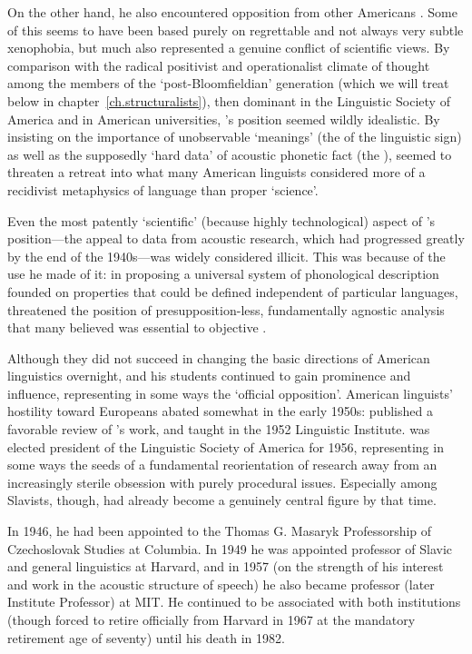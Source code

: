 On the other hand, he also encountered opposition from other Americans
\citep{dixon07:jakobson.2dollar.bills}. Some of this seems to have
been based purely on regrettable and not always very subtle
xenophobia, but much also represented a genuine conflict of scientific
views. By comparison with the radical positivist and operationalist
climate of thought among the members of the `post-Bloomfieldian'
generation (which we will treat below in
chapter~\ref{ch.structuralists}), then dominant in the Linguistic
Society of America and in American universities, {\Jakobson}'s position
seemed wildly idealistic. By insisting on the importance of
unobservable `meanings' (the \emph{} of the linguistic sign)
as well as the supposedly `hard data' of acoustic phonetic fact (the
\emph{}), {\Jakobson} seemed to threaten a retreat into what
many American linguists considered more of a recidivist metaphysics of
language than proper `science'.

Even the most patently `scientific' (because highly technological)
aspect of {\Jakobson}'s position—the appeal to data from acoustic
research, which had progressed greatly by the end of the 1940s—was
widely considered illicit. This was because of the use he made of it:
in proposing a universal system of phonological description founded on
properties that could be defined independent of particular languages,
{\Jakobson} threatened the position of presupposition-less, fundamentally
agnostic analysis that many believed was essential to objective
.

Although they did not succeed in changing the basic directions of
American linguistics overnight, {\Jakobson} and his students continued to
gain prominence and influence, representing in some ways the `official
opposition'. American linguists' hostility toward Europeans abated
somewhat in the early 1950s: \citet{hockett51:review.martinet}
published a favorable review of {\Martinet}'s work, and {\Hjelmslev} taught
in the 1952 {Linguistic Institute}. {\Jakobson} was elected president of
the {Linguistic Society of America} for 1956, representing in some ways
the seeds of a fundamental reorientation of research away from an
increasingly sterile obsession with purely procedural
issues. Especially among Slavists, though, {\Jakobson} had already become
a genuinely central figure by that time.

In 1946, he had been appointed to the Thomas G. Masaryk Professorship
of Czechoslovak Studies at Columbia. In 1949 he was appointed
professor of Slavic and general linguistics at Harvard, and in 1957
(on the strength of his interest and work in the acoustic structure of
speech) he also became professor (later Institute Professor) at
MIT. He continued to be associated with both institutions (though
forced to retire officially from Harvard in 1967 at the mandatory
retirement age of seventy) until his death in 1982.

